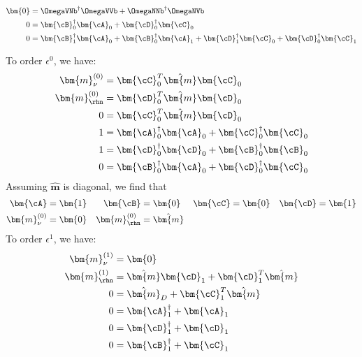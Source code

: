 \begin{align}
	\bm{0} & = \OmegaVNb^{\dagger}\OmegaVVb + \OmegaNNb^{\dagger}\OmegaNVb             \\
	0      & = \bm{\cB}_{0}^{\dagger}\bm{\cA}_{0} + \bm{\cD}_{0}^{\dagger}\bm{\cC}_{0} \\
	0      & =
	\bm{\cB}_{1}^{\dagger}\bm{\cA}_{0} +
	\bm{\cB}_{0}^{\dagger}\bm{\cA}_{1} +
	\bm{\cD}_{1}^{\dagger}\bm{\cC}_{0} +
	\bm{\cD}_{0}^{\dagger}\bm{\cC}_{1}
\end{align}

To order \(\epsilon^{0}\), we have:
\begin{align}
	\bm{m}^{(0)}_{\nu}  & = \bm{\cC}_{0}^{T}\hat{\bm{m}}\bm{\cC}_{0}                                \\
	\bm{m}^{(0)}_{\rhn} & = \bm{\cD}_{0}^{T}\hat{\bm{m}}\bm{\cD}_{0}                                \\
	0                   & = \bm{\cC}_{0}^{T}\hat{\bm{m}}\bm{\cD}_{0}                                \\
	1                   & = \bm{\cA}_{0}^{\dagger}\bm{\cA}_{0} + \bm{\cC}_{0}^{\dagger}\bm{\cC}_{0} \\
	1                   & = \bm{\cD}_{0}^{\dagger}\bm{\cD}_{0} + \bm{\cB}_{0}^{\dagger}\bm{\cB}_{0} \\
	0                   & = \bm{\cB}_{0}^{\dagger}\bm{\cA}_{0} + \bm{\cD}_{0}^{\dagger}\bm{\cC}_{0}
\end{align}
Assuming \(\hat{\bm{m}}\) is diagonal, we find that
\begin{align}
	\bm{\cA}            & = \bm{1}       &
	\bm{\cB}            & = \bm{0}       &
	\bm{\cC}            & = \bm{0}       &
	\bm{\cD}            & = \bm{1}         \\
	\bm{m}^{(0)}_{\nu}  & = \bm{0}       &
	\bm{m}^{(0)}_{\rhn} & = \hat{\bm{m}}
\end{align}
To order \(\epsilon^{1}\), we have:
\begin{align}
	\bm{m}^{(1)}_{\nu}  & = \bm{0} \\
	\bm{m}^{(1)}_{\rhn} & =
	\hat{\bm{m}}\bm{\cD}_{1}
	+\bm{\cD}_{1}^{T}\hat{\bm{m}}  \\
	0                   & =
	\hat{\bm{m}}_{D}
	+\bm{\cC}_{1}^{T}\hat{\bm{m}}  \\
	0                   & =
	\bm{\cA}_{1}^{\dagger} +
	\bm{\cA}_{1}                   \\
	0                   & =
	\bm{\cD}_{1}^{\dagger} +
	\bm{\cD}_{1}                   \\
	0                   & =
	\bm{\cB}_{1}^{\dagger} +
	\bm{\cC}_{1}
\end{align}

